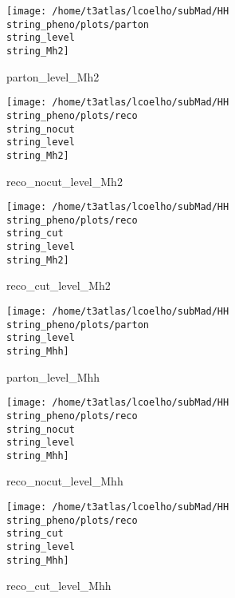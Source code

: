 \documentclass[a4paper,onecolumn,final,11pt]{article}
\begin{document}
\begin{figure}[H] 
\centering 
\begin{minipage}{.32\textwidth} 
        \centering 
        \hspace{0cm} 
        \texttt{[image: /home/t3atlas/lcoelho/subMad/HH\\string\_pheno/plots/parton\\string\_level\\string\_Mh2]} 
        \caption{parton_level_Mh2} 
\end{minipage} 
\hfill 
\begin{minipage}{.32\textwidth} 
        \centering 
        \hspace{0cm} 
    \texttt{[image: /home/t3atlas/lcoelho/subMad/HH\\string\_pheno/plots/reco\\string\_nocut\\string\_level\\string\_Mh2]} 
        \caption{reco_nocut_level_Mh2} 
\end{minipage} 
\hfill 
\begin{minipage}{.32\textwidth} 
        \centering 
        \hspace{0cm} 
    \texttt{[image: /home/t3atlas/lcoelho/subMad/HH\\string\_pheno/plots/reco\\string\_cut\\string\_level\\string\_Mh2]} 
        \caption{reco_cut_level_Mh2} 
\end{minipage} 
\end{figure} 
 
\begin{figure}[H] 
\centering 
\begin{minipage}{.32\textwidth} 
        \centering 
        \hspace{0cm} 
        \texttt{[image: /home/t3atlas/lcoelho/subMad/HH\\string\_pheno/plots/parton\\string\_level\\string\_Mhh]} 
        \caption{parton_level_Mhh} 
\end{minipage} 
\hfill 
\begin{minipage}{.32\textwidth} 
        \centering 
        \hspace{0cm} 
    \texttt{[image: /home/t3atlas/lcoelho/subMad/HH\\string\_pheno/plots/reco\\string\_nocut\\string\_level\\string\_Mhh]} 
        \caption{reco_nocut_level_Mhh} 
\end{minipage} 
\hfill 
\begin{minipage}{.32\textwidth} 
        \centering 
        \hspace{0cm} 
    \texttt{[image: /home/t3atlas/lcoelho/subMad/HH\\string\_pheno/plots/reco\\string\_cut\\string\_level\\string\_Mhh]} 
        \caption{reco_cut_level_Mhh} 
\end{minipage} 
\end{figure} 
 
\end{document}
